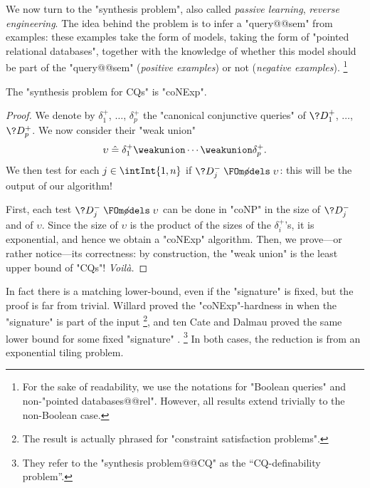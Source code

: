 We now turn to the "synthesis problem", also called \emph{passive learning},
\emph{reverse engineering}. The idea behind the problem is to infer a
"query@@sem" from examples: these examples take the form
of models, taking the form of "pointed relational databases", together
with the knowledge of whether this model should be part of the "query@@sem"
(\emph{positive examples}) or not (\emph{negative examples}).%
\footnote{For the sake of readability, we use the notations
for "Boolean queries" and non-"pointed databases@@rel".
However, all results extend trivially to the non-Boolean case.}


\begin{proposition}
	The "synthesis problem for CQs" is "coNExp".
\end{proposition}


\begin{proof}
	We denote by $\delta^+_1$, $\dotsc$, $\delta^+_p$ the "canonical conjunctive queries"
	of $\?D^+_1$, $\dotsc$, $\?D^+_p$.
	We now consider their "weak union"
	\[
		\upsilon \defeq \delta^+_1 \weakunion \cdots \weakunion \delta^+_p.
	\]
	We then test for each $j\in \intInt{1,n}$ if 
	$\?D^-_j \centernot{\FOmodels} \upsilon$: this will be
	the output of our algorithm!
	
	First, each test $\?D^-_j \centernot{\FOmodels} \upsilon$
	can be done in "coNP" in the size of $\?D^-_j$ and of
	$\upsilon$. Since the size of $\upsilon$ is the product of
	the sizes of the $\delta^+_i$'s, it is exponential,
	and hence we obtain a "coNExp" algorithm.
	Then, we prove---or rather notice---its correctness: by construction,
	the "weak union" is the least upper bound of "CQs"! \emph{Voilà.}
\end{proof}

In fact there is a matching lower-bound, even if the "signature" is fixed,
but the  proof is far from trivial.
Willard proved the "coNExp"-hardness in
\cite[Theorem~3]{Willard2010Testing} when the "signature" is part of the input%
\footnote{The result is actually phrased for "constraint satisfaction problems".},
and ten Cate and Dalmau proved the same lower bound
for some fixed "signature" \cite[Theorem~2]{tenCateDalmau2015Product}.%
\footnote{They refer to the "synthesis problem@@CQ" as the ``CQ-definability problem''.}
In both cases, the reduction is from an exponential tiling problem.

